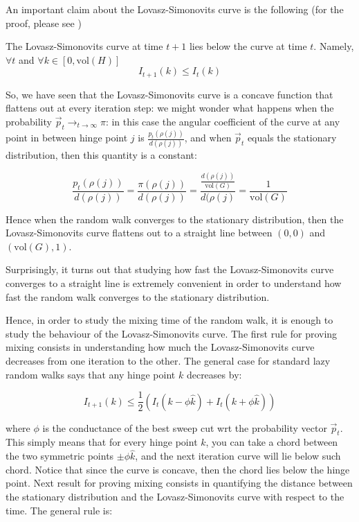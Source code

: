 \documentclass[../main.tex]{subfiles}
\begin{document}
    An important claim about the Lovasz-Simonovits curve is the following (for the proof, please see \cite{LScurve_decreasing})
    
    \begin{lemma}
        The Lovasz-Simonovits curve at time $t+1$ lies below the curve at time $t$. Namely, $\forall t$ and $\forall k\in[0,\text{vol}(H)]$
        \begin{equation}
            I_{t+1}(k) \leq I_t(k)
        \end{equation}
    \end{lemma}
    
    So, we have seen that the Lovasz-Simonovits curve is a concave function that flattens out at every iteration step: we might wonder what happens when the probability $\vec{p}_t\to_{t\to \infty} \pi$: in this case the angular coefficient of the curve at any point in between hinge point $j$ is $\frac{p_t(\rho(j))}{d(\rho(j))}$, and when $\vec{p}_t$ equals the stationary distribution, then this quantity is a constant: 
    
    \begin{equation} 
        \frac{p_t(\rho(j))}{d(\rho(j))} = \frac{\pi(\rho(j))}{d(\rho(j))} = \frac{\frac{d(\rho(j))}{\text{vol}(G)}}{d(\rho(j)} = \frac{1}{\text{vol}(G)}
    \end{equation}
    
    Hence when the random walk converges to the stationary distribution, then the Lovasz-Simonovits curve flattens out to a straight line between $(0,0)$ and $(\text{vol}(G), 1)$.
    
    Surprisingly, it turns out that studying how fast the Lovasz-Simonovits curve converges to a straight line is extremely convenient in order to understand how fast the random walk converges to the stationary distribution. 
    
    Hence, in order to study the mixing time of the random walk, it is enough to study the behaviour of the Lovasz-Simonovits curve. 
    The first rule for proving mixing consists in understanding how much the Lovasz-Simonovits curve decreases from one iteration to the other. The general case for standard lazy random walks says that any hinge point $k$ decreases by:
    
    \begin{equation}
        I_{t+1}(k) \leq \frac{1}{2}(I_t(k-\phi \hat{k}) + I_t(k+\phi \hat{k}))
    \end{equation}
    
    where $\phi$ is the conductance of the best sweep cut wrt the probability vector $\vec{p}_t$. This simply means that for every hinge point $k$, you can take a chord between the two symmetric points $\pm \phi \hat{k}$, and the next iteration curve will lie below such chord. Notice that since the curve is concave, then the chord lies below the hinge point. Next result for proving mixing consists in quantifying the distance between the stationary distribution and the Lovasz-Simonovits curve with respect to the time. The general rule is:
    
\end{document}
